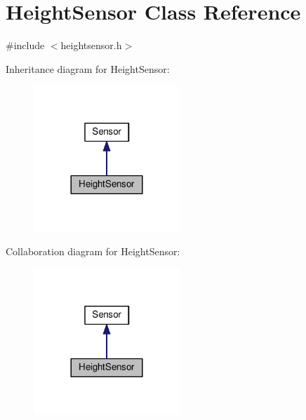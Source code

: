 \hypertarget{classHeightSensor}{}\section{Height\+Sensor Class Reference}
\label{classHeightSensor}


{\ttfamily \#include $<$heightsensor.\+h$>$}



Inheritance diagram for Height\+Sensor\+:\nopagebreak
\begin{figure}[H]
\begin{center}
\leavevmode
\includegraphics[width=156pt]{classHeightSensor__inherit__graph}
\end{center}
\end{figure}


Collaboration diagram for Height\+Sensor\+:\nopagebreak
\begin{figure}[H]
\begin{center}
\leavevmode
\includegraphics[width=156pt]{classHeightSensor__coll__graph}
\end{center}
\end{figure}
